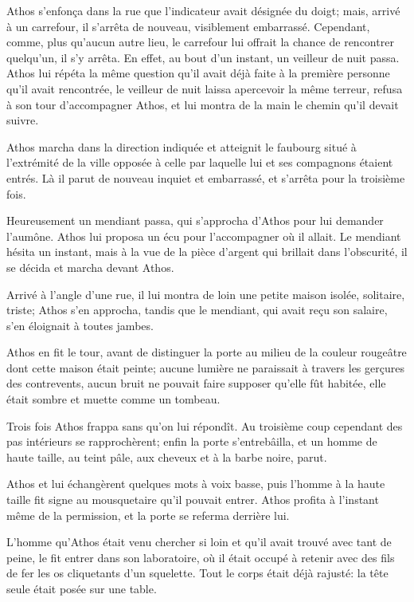 Athos s'enfonça dans la rue que l'indicateur avait désignée du doigt; mais, arrivé à un carrefour, il s'arrêta de nouveau, visiblement embarrassé. Cependant, comme, plus qu'aucun autre lieu, le carrefour lui offrait la chance de rencontrer quelqu'un, il s'y arrêta. En effet, au bout d'un instant, un veilleur de nuit passa. Athos lui répéta la même question qu'il avait déjà faite à la première personne qu'il avait rencontrée, le veilleur de nuit laissa apercevoir la même terreur, refusa à son tour d'accompagner Athos, et lui montra de la main le chemin qu'il devait suivre. 

Athos marcha dans la direction indiquée et atteignit le faubourg situé à l'extrémité de la ville opposée à celle par laquelle lui et ses compagnons étaient entrés. Là il parut de nouveau inquiet et embarrassé, et s'arrêta pour la troisième fois. 

Heureusement un mendiant passa, qui s'approcha d'Athos pour lui demander l'aumône. Athos lui proposa un écu pour l'accompagner où il allait. Le mendiant hésita un instant, mais à la vue de la pièce d'argent qui brillait dans l'obscurité, il se décida et marcha devant Athos. 

Arrivé à l'angle d'une rue, il lui montra de loin une petite maison isolée, solitaire, triste; Athos s'en approcha, tandis que le mendiant, qui avait reçu son salaire, s'en éloignait à toutes jambes. 

Athos en fit le tour, avant de distinguer la porte au milieu de la couleur rougeâtre dont cette maison était peinte; aucune lumière ne paraissait à travers les gerçures des contrevents, aucun bruit ne pouvait faire supposer qu'elle fût habitée, elle était sombre et muette comme un tombeau. 

Trois fois Athos frappa sans qu'on lui répondît. Au troisième coup cependant des pas intérieurs se rapprochèrent; enfin la porte s'entrebâilla, et un homme de haute taille, au teint pâle, aux cheveux et à la barbe noire, parut. 

Athos et lui échangèrent quelques mots à voix basse, puis l'homme à la haute taille fit signe au mousquetaire qu'il pouvait entrer. Athos profita à l'instant même de la permission, et la porte se referma derrière lui. 

L'homme qu'Athos était venu chercher si loin et qu'il avait trouvé avec tant de peine, le fit entrer dans son laboratoire, où il était occupé à retenir avec des fils de fer les os cliquetants d'un squelette. Tout le corps était déjà rajusté: la tête seule était posée sur une table. 

